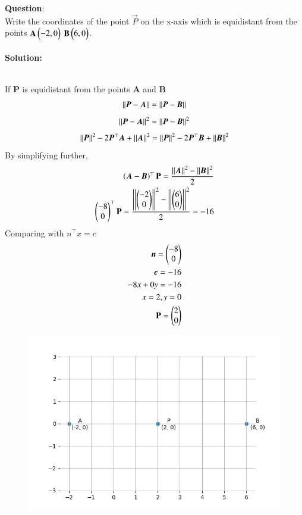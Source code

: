 \documentclass[journal]{IEEEtran}
\begin{document}
\textbf{Question}:\\
Write the coordinates of the point $\vec{P}$ on the x-axis which is equidistant from the points $\mathbf{A}\begin{pmatrix}-2,0\end{pmatrix}$ $\mathbf{B}\begin{pmatrix}6,0\end{pmatrix}$.\hfill{}\\
\\ \textbf{Solution: }\\
    \begin{table}[h!]    
      \centering
      
      \caption{}
    \end{table}\\
If \textbf{P} is equidistant from the points \textbf{A} and \textbf{B}
    \begin{align}
        \left\vert\left\vert\boldsymbol{P}-\boldsymbol{A}\right\vert\right\vert = \left\vert\left\vert\boldsymbol{P}-\boldsymbol{B}\right\vert\right\vert \label{eq1.1.8.28.1}
    \end{align}
     \begin{align}
        \left\vert\left\vert\boldsymbol{P}-\boldsymbol{A}\right\vert\right\vert^2 = \left\vert\left\vert\boldsymbol{P}-\boldsymbol{B}\right\vert\right\vert^2\label{eq1.1.8.28.2}
    \end{align}
    \begin{align}
    	\left\vert\left\vert\boldsymbol{P}\right\vert\right\vert^2 - 2\boldsymbol{P}^\top \boldsymbol{A} + \left\vert\left\vert\boldsymbol{A}\right\vert\right\vert^2 = \left\vert\left\vert\boldsymbol{P}\right\vert\right\vert^2 - 2\boldsymbol{P}^\top\boldsymbol{B} + \left\vert\left\vert\boldsymbol{B}\right\vert\right\vert^2\label{eq1.1.8.28.3}
    \end{align}
By simplifying further,
    \begin{align}
    	\left(\boldsymbol{A}-\boldsymbol{B}\right)^\top \mathbf{P} = \frac{\left\vert\left\vert\boldsymbol{A}\right\vert\right\vert^2-\left\vert\left\vert\boldsymbol{B}\right\vert\right\vert^2}{2} \\
    	\begin{pmatrix}-8 \\ 0\end{pmatrix}^\top \mathbf{P} = \frac{\left\vert\left\vert\begin{pmatrix}-2 \\ 0\end{pmatrix}\right\vert\right\vert^2-\left\vert\left\vert\begin{pmatrix}6 \\ 0\end{pmatrix}\right\vert\right\vert^2}{2} = -16\label{eq1.1.8.28.4}
    \end{align}
Comparing with $n^\top x = c$
    \begin{align}
    	\boldsymbol{n} = \begin{pmatrix}-8 \\ 0\end{pmatrix}\\ \label{eq1.1.8.28.5}
	    \boldsymbol{c} = -16\\
     -8x+0y=-16\\
     x=2,y=0\\
     \mathbf{P}=\begin{pmatrix}2 \\ 0\end{pmatrix}
    \end{align}
    \begin{figure}[h]
        \centering
       \includegraphics[width=0.7\linewidth]{figs/fig1.png}
       \caption{}
       \label{graph}
    \end{figure}
\end{document}
